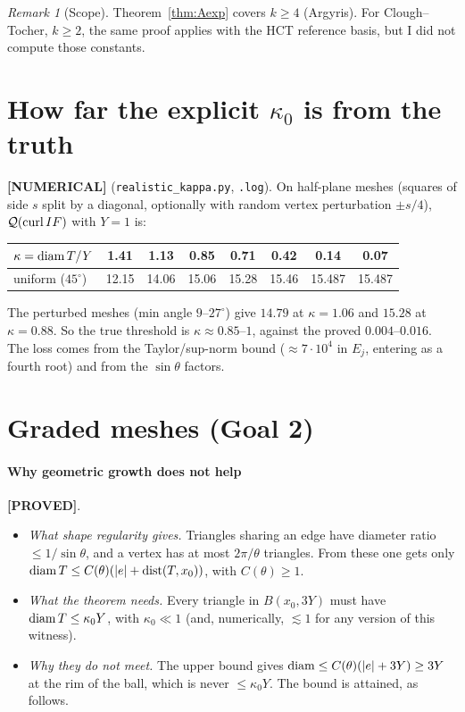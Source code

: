 \documentclass[11pt]{article}
\theoremstyle{remark}\newtheorem{remark}[theorem]{Remark}
\newcommand{\lab}[1]{\textbf{[#1]}}
\begin{document}
\begin{remark}[Scope]
Theorem~\ref{thm:Aexp} covers $k\ge4$ (Argyris). For Clough--Tocher, $k\ge2$, the same proof applies with the HCT reference
basis, but I did not compute those constants.
\end{remark}

\section{How far the explicit $\kappa_0$ is from the truth}
\lab{NUMERICAL} (\texttt{realistic\_kappa.py}, \texttt{.log}). On half-plane meshes (squares of side $s$ split by a
diagonal, optionally with random vertex perturbation $\pm s/4$), $\mathcal Q(\operatorname{curl} IF)$ with $Y=1$ is:
\begin{center}\small\begin{tabular}{lccccccc}
\toprule
$\kappa=\operatorname{diam} T/Y$ & 1.41 & 1.13 & 0.85 & 0.71 & 0.42 & 0.14 & 0.07\\
\midrule
uniform ($45^\circ$) & 12.15 & 14.06 & 15.06 & 15.28 & 15.46 & 15.487 & 15.487\\
\bottomrule
\end{tabular}\end{center}
The perturbed meshes (min angle $9$--$27^\circ$) give $14.79$ at $\kappa=1.06$ and $15.28$ at $\kappa=0.88$. So the true
threshold is $\kappa\approx0.85$--$1$, against the proved $0.004$--$0.016$. The loss comes from the Taylor/sup-norm bound
($\approx7\cdot10^4$ in $E_j$, entering as a fourth root) and from the $\sin\theta$ factors.

\section{Graded meshes (Goal 2)}
\paragraph{Why geometric growth does not help} \lab{PROVED}.
\begin{itemize}
\item \emph{What shape regularity gives.} Triangles sharing an edge have diameter ratio $\le1/\sin\theta$, and a vertex has
at most $2\pi/\theta$ triangles. From these one gets only $\operatorname{diam} T\le C(\theta)(|e|+\operatorname{dist}(T,x_0))$, with
$C(\theta)\ge1$.
\item \emph{What the theorem needs.} Every triangle in $B(x_0,3Y)$ must have $\operatorname{diam} T\le\kappa_0Y$, with $\kappa_0\ll1$ (and,
numerically, $\lesssim1$ for any version of this witness).
\item \emph{Why they do not meet.} The upper bound gives $\operatorname{diam}\le C(\theta)(|e|+3Y)\ge3Y$ at the rim of the ball, which is
never $\le\kappa_0Y$. The bound is attained, as follows.
\end{itemize}
\end{document}
